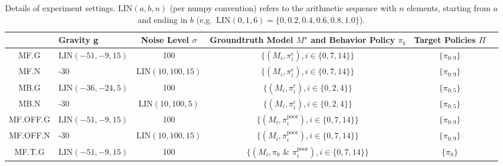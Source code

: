 \begin{table}[h]
%
    \centering
    \begin{tabular}{c l c c c c}
    \toprule
    \textbf{} & %
    \textbf{Gravity $\mathbf{g}$} & \textbf{Noise Level $\sigma$} & \makecell{\textbf{Groundtruth Model $M^\star$ and}\\\textbf{Behavior Policy} $\pi_b$} & \makecell{\textbf{Target}\\\textbf{Policies $\Pi$}} \\
    \midrule
%
    MF.G \label{mf.on.g} %
    & $\text{LIN}(-51, -9, 15)$ & 100 & $\{(M_i, \pi_i^{\epsilon}), i\in \{0,7,14\}\}$ & $\{\pi_{0:9}\}$ \\
    MF.N \label{mf.on.n} %
    & -30 & $\text{LIN}(10,100,15)$ & $\{(M_i, \pi_i^{\epsilon}), i\in \{0,7,14\}\}$ & $\{\pi_{0:9}\}$ \\
        MB.G \label{mbg} %
    & $\text{LIN}(-36,-24,5)$ & 100 & $\{(M_i, \pi_i^{\epsilon}%
    ), i\in \{0,2,4\}\}$ & $\{\pi_{0:5}\}$ \\%
    MB.N \label{mbn} %
    & -30 & $\text{LIN}(10,100,5)$ & $\{(M_i, \pi_i^{\epsilon}), i\in \{0,2,4\}\}$ & $\{\pi_{0:5}\}$  \\
    MF.OFF.G \label{mf.off.g} %
    & $\text{LIN}(-51, -9, 15)$ & 100 & $\{(M_i, \pi_i^{\textrm{poor}}), i\in \{0,7,14\}\}$ & $\{\pi_{0:9}\}$  \\
    MF.OFF.N \label{mf.off.n} %
    & -30 & $\text{LIN}(10,100,15)$ & $\{(M_i, \pi_i^{\textrm{poor}}), i\in \{0,7,14\}\}$ & $\{\pi_{0:9}\}$  \\
    MF.T.G \label{mf.off.g} 
    & $\text{LIN}(-51, -9, 15)$ & 100 & $\{(M_i, \pi_8 \textrm{~\&~} \pi_i^{\textrm{poor}}), i\in \{0,7,14\}\}$ & $\{\pi_8\}$ \\
    \bottomrule
    \end{tabular}
    \caption{Details of experiment settings.  $\text{LIN}(a,b,n)$ (per numpy convention) refers to the arithmetic sequence with $n$ elements, starting from $a$ and ending in $b$ (e.g.~$\text{LIN}(0,1,6) = \{0, 0.2, 0.4, 0.6, 0.8, 1.0\}$).  \label{tab:exp_detail} }
\end{table}